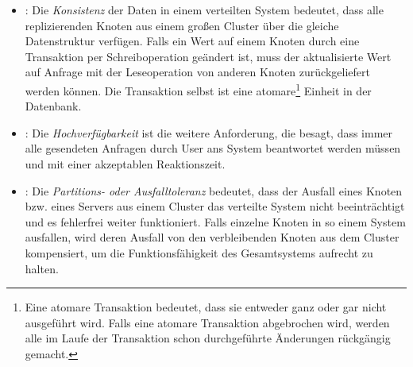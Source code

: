 
\begin{itemize}
\item \Cap: Die \textit{Konsistenz} der Daten in einem verteilten System bedeutet, dass alle replizierenden Knoten aus einem großen Cluster über die gleiche Datenstruktur verfügen. Falls ein Wert auf einem Knoten durch eine Transaktion per Schreiboperation geändert ist, muss der aktualisierte Wert auf Anfrage mit der Leseoperation von anderen Knoten zurückgeliefert werden können. Die Transaktion selbst ist eine atomare\footnote{Eine atomare Transaktion bedeutet, dass sie entweder ganz oder gar nicht ausgeführt wird. Falls eine atomare Transaktion abgebrochen wird, werden alle im Laufe der Transaktion schon durchgeführte Änderungen rückgängig gemacht.} Einheit in der Datenbank.
%
%
%
%
%
\item \cAp: Die \textit{Hochverfügbarkeit} ist die weitere Anforderung, die besagt, dass immer alle gesendeten Anfragen durch User ans System beantwortet werden müssen und mit einer akzeptablen Reaktionszeit.
\item \caP: Die \textit{Partitions- oder Ausfalltoleranz} bedeutet, dass der Ausfall eines Knoten bzw. eines Servers aus einem Cluster das verteilte System nicht beeinträchtigt und es fehlerfrei weiter funktioniert. Falls einzelne Knoten in so einem System ausfallen, wird deren Ausfall von den verbleibenden Knoten aus dem Cluster kompensiert, um die Funktionsfähigkeit des Gesamtsystems aufrecht zu halten.

\end{itemize}


